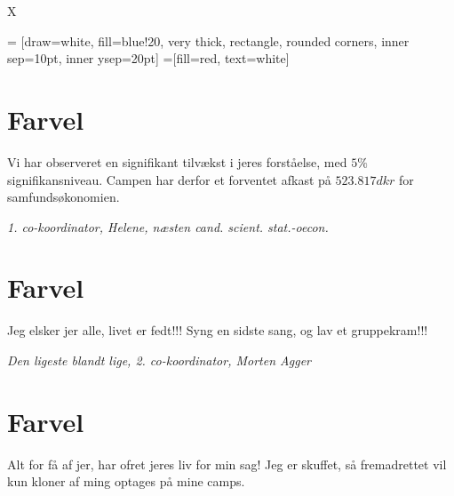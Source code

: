 

\begin{minipage}[b]{0.95\linewidth}
\begin{minipage}[t]{0.47\textwidth}
\vspace{3mm}
X
\end{minipage}
\hfill\begin{minipage}[t]{0.47\textwidth}

\vspace{1mm}
 = [draw=white, fill=blue!20, very thick,
    rectangle, rounded corners, inner sep=10pt, inner ysep=20pt]
 =[fill=red, text=white]

%

\section*{Farvel}
Vi har observeret en signifikant tilvækst i jeres forståelse, med $5\%$ signifikansniveau. Campen har derfor et forventet afkast på $523.817 dkr$ for samfundsøkonomien.

{\flushright\emph{1. co-koordinator, Helene, næsten cand. scient. stat.-oecon.}}

\section*{Farvel}
Jeg elsker jer alle, livet er fedt!!! Syng en sidste sang, og lav et gruppekram!!!

{\flushright\emph{Den ligeste blandt lige, 2. co-koordinator, Morten Agger}}

\section*{Farvel}
Alt for få af jer, har ofret jeres liv for min sag! Jeg er skuffet, så fremadrettet vil kun kloner af ming optages på mine camps. 


\end{minipage}
\end{minipage}
